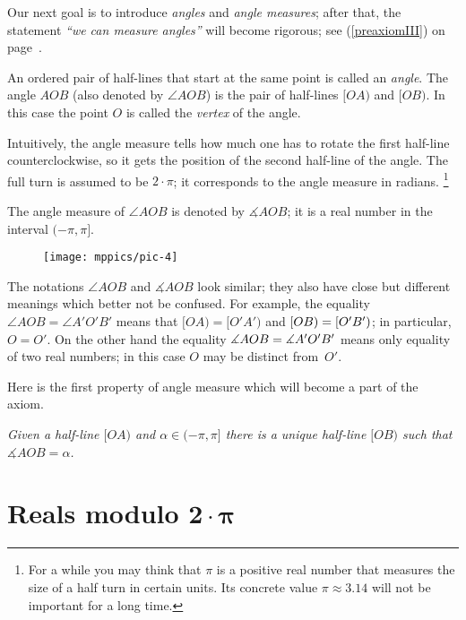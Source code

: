 Our next goal is to introduce {}\emph{angles} and {}\emph{angle measures}; 
after that, the statement {}\emph{``we can measure angles''} will become rigorous;
see (\ref{preaxiomIII}) on page~\pageref{preaxiomIII}.

An ordered pair of half-lines that start at the same point is called an \emph{angle}.
The angle $AOB$ (also denoted by $\angle AOB$) is the pair of half-lines $[OA)$ and $[OB)$.
In this case the point $O$ is called the \emph{vertex} of the angle.

Intuitively, the angle measure tells how much one has to rotate the first half-line counterclockwise, so it gets the position of the second half-line of the angle. 
The full turn is assumed to be $2\cdot\pi$;
it corresponds to the angle measure in radians.%
\footnote{For a while you may think that $\pi$ is a positive real number that measures the size of a half turn in certain units. Its concrete value $\pi\approx 3.14$ will not be important for a long time.}

The angle measure of $\angle AOB$ is denoted by $\measuredangle AOB$;
it is a real number in the interval $(-\pi,\pi]$. 

\begin{wrapfigure}{o}{25mm}
\vskip-0mm
\centering
\texttt{[image: mppics/pic-4]}
\end{wrapfigure}

The notations $\angle AOB$ and $\measuredangle AOB$ look similar;
they also have close but different meanings which better not be confused.
For example, the equality 
$\angle AOB=\angle A'O'B'$
means that
$[OA)=[O'A')$ and $[OB)\z=[O'B')$;
in particular, $O=O'$.
On the other hand the equality 
$\measuredangle AOB\z=\measuredangle A'O'B'$ 
means only equality of two real numbers;
in this case $O$ may be distinct from~$O'$.

Here is the first property of angle measure which will become a part of the axiom.

\textit{Given a half-line $[O A)$ and $\alpha\in(-\pi,\pi]$ there is a unique half-line $[O B)$ such that $\measuredangle A O B= \alpha$.}





\section*{Reals modulo $\bm{2\cdot\pi}$}



